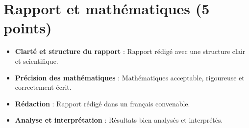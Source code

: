 \documentclass[a4paper,12pt]{article}
\begin{document}
\section*{Rapport et mathématiques (5 points)}
\begin{itemize}
    \item \textbf{Clarté et structure du rapport} : Rapport rédigé avec une structure clair et scientifique.
    \item \textbf{Précision des mathématiques} : Mathématiques acceptable, rigoureuse et correctement écrit.
    \item \textbf{Rédaction} : Rapport rédigé dans un français convenable.
    \item \textbf{Analyse et interprétation} : Résultats bien analysés et interprétés.
\end{itemize}
\end{document}

